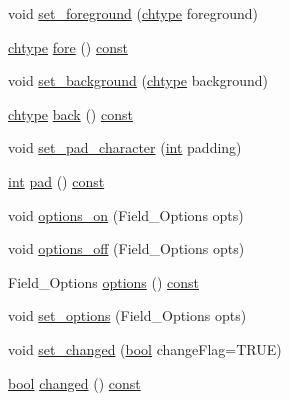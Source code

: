 \begin{DoxyCompactItemize}
\item 
void \hyperlink{class_n_curses_form_field_a68cf4e46c57289510fa6835ee39ee119}{set\-\_\-foreground} (\hyperlink{curses_8priv_8h_ad21482314c581139d01159829e841e51}{chtype} foreground)
\item 
\hyperlink{curses_8priv_8h_ad21482314c581139d01159829e841e51}{chtype} \hyperlink{class_n_curses_form_field_a4bfb93b9802f063332cca6e337e6be44}{fore} () \hyperlink{term__entry_8h_a57bd63ce7f9a353488880e3de6692d5a}{const} 
\item 
void \hyperlink{class_n_curses_form_field_a12fa2b773e85bf1eb5b56ef876de807d}{set\-\_\-background} (\hyperlink{curses_8priv_8h_ad21482314c581139d01159829e841e51}{chtype} background)
\item 
\hyperlink{curses_8priv_8h_ad21482314c581139d01159829e841e51}{chtype} \hyperlink{class_n_curses_form_field_afb6619ece2151f0439cf6fc23a1c16d1}{back} () \hyperlink{term__entry_8h_a57bd63ce7f9a353488880e3de6692d5a}{const} 
\item 
void \hyperlink{class_n_curses_form_field_a6e6308c00d9a64490430a77a210af732}{set\-\_\-pad\-\_\-character} (\hyperlink{term__entry_8h_ad65b480f8c8270356b45a9890f6499ae}{int} padding)
\item 
\hyperlink{term__entry_8h_ad65b480f8c8270356b45a9890f6499ae}{int} \hyperlink{class_n_curses_form_field_aaba43d1e24b151e40f115fbc5b75f926}{pad} () \hyperlink{term__entry_8h_a57bd63ce7f9a353488880e3de6692d5a}{const} 
\item 
void \hyperlink{class_n_curses_form_field_ad4d0e5a0449985f2bb2c760aa97ebe98}{options\-\_\-on} (Field\-\_\-\-Options opts)
\item 
void \hyperlink{class_n_curses_form_field_a907218551eda01d52ac85452e2618451}{options\-\_\-off} (Field\-\_\-\-Options opts)
\item 
Field\-\_\-\-Options \hyperlink{class_n_curses_form_field_af8063599c777ce444900efe8b4221047}{options} () \hyperlink{term__entry_8h_a57bd63ce7f9a353488880e3de6692d5a}{const} 
\item 
void \hyperlink{class_n_curses_form_field_a72dd566c56b181cb437403aabd0c5743}{set\-\_\-options} (Field\-\_\-\-Options opts)
\item 
void \hyperlink{class_n_curses_form_field_a97ed67480e3af143a77119ba22e1462d}{set\-\_\-changed} (\hyperlink{term__entry_8h_a002004ba5d663f149f6c38064926abac}{bool} change\-Flag=T\-R\-U\-E)
\item 
\hyperlink{term__entry_8h_a002004ba5d663f149f6c38064926abac}{bool} \hyperlink{class_n_curses_form_field_acaa055d09a709e76a4e9dbce6efe4f03}{changed} () \hyperlink{term__entry_8h_a57bd63ce7f9a353488880e3de6692d5a}{const} 

\end{DoxyCompactItemize}
